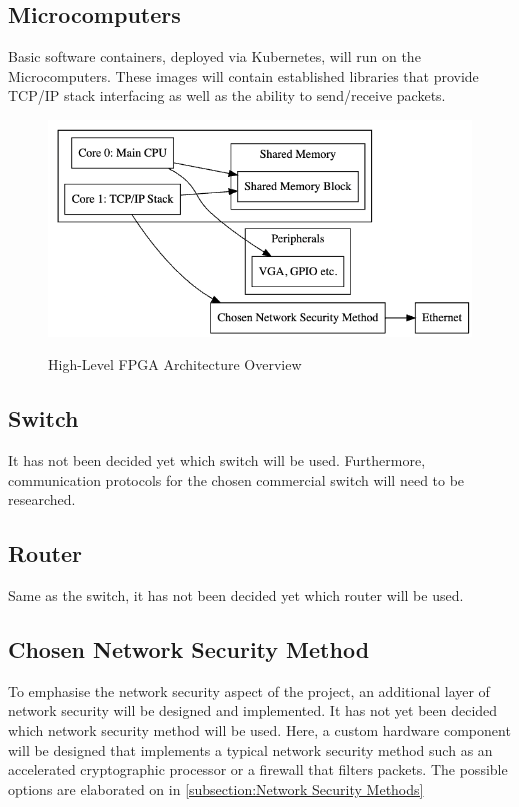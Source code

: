 \subsection{Microcomputers}
Basic software containers, deployed via Kubernetes, will run on the Microcomputers. These images will contain established libraries that provide TCP/IP stack interfacing as well as the ability to send/receive packets.
\begin{figure}[h]
    \begin{center}
    \caption{High-Level FPGA Architecture Overview}
    \includegraphics[width=1.0\textwidth]{./Figures/FPGA_Architecture_High_Level.png}
    \label{Fig:2}
    \end{center}
\end{figure}
\subsection{Switch}
It has not been decided yet which switch will be used. Furthermore, communication protocols for the chosen commercial switch will need to be researched.
\subsection{Router}
Same as the switch, it has not been decided yet which router will be used.
\subsection{Chosen Network Security Method}
To emphasise the network security aspect of the project, an additional layer of network security will be designed and implemented. It has not yet been decided which network security method will be used. Here, a custom hardware component will be designed that implements a typical network security method such as an accelerated cryptographic processor or a firewall that filters packets. The possible options are elaborated on in \ref{subsection:Network Security Methods}
\clearpage